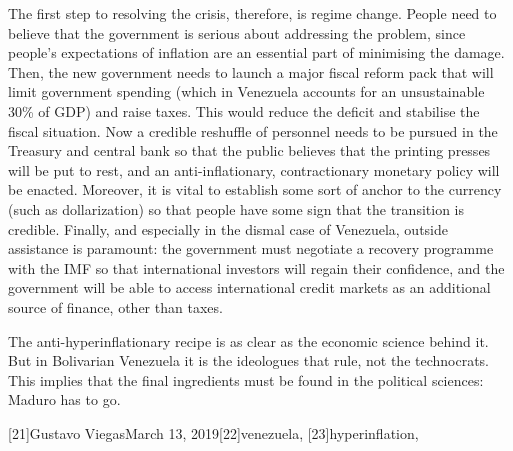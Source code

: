    The first step to resolving the crisis, therefore, is regime change.
   People need to believe that the government is serious about addressing
   the problem, since people's expectations of inflation are an essential
   part of minimising the damage. Then, the new government needs to launch
   a major fiscal reform pack that will limit government spending (which
   in Venezuela accounts for an unsustainable 30\% of GDP) and raise taxes.
   This would reduce the deficit and stabilise the fiscal situation. Now a
   credible reshuffle of personnel needs to be pursued in the Treasury and
   central bank so that the public believes that the printing presses will
   be put to rest, and an anti-inflationary, contractionary monetary
   policy will be enacted. Moreover, it is vital to establish some sort of
   anchor to the currency (such as dollarization) so that people have some
   sign that the transition is credible. Finally, and especially in the
   dismal case of Venezuela, outside assistance is paramount: the
   government must negotiate a recovery programme with the IMF so that
   international investors will regain their confidence, and the
   government will be able to access international credit markets as an
   additional source of finance, other than taxes.

   The anti-hyperinflationary recipe is as clear as the economic science
   behind it. But in Bolivarian Venezuela it is the ideologues that rule,
   not the technocrats. This implies that the final ingredients must be
   found in the political sciences: Maduro has to go.

   [21]Gustavo ViegasMarch 13, 2019[22]venezuela, [23]hyperinflation,
